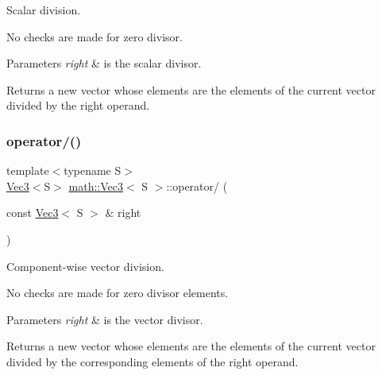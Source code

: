 Scalar division.

No checks are made for zero divisor.


\begin{DoxyParams}{Parameters}
{\em right} & is the scalar divisor.\\
\hline
\end{DoxyParams}
\begin{DoxyReturn}{Returns}
a new vector whose elements are the elements of the current vector divided by the right operand. 
\end{DoxyReturn}
\mbox{\label{classmath_1_1_vec3_a146b07bcbe24f5a380276adb8270b10e}} 
\subsubsection{\texorpdfstring{operator/()}{operator/()}\hspace{0.1cm}{\footnotesize\ttfamily [2/2]}}
{\footnotesize\ttfamily template$<$typename S$>$ \\
\hyperlink{classmath_1_1_vec3}{Vec3}$<$S$>$ \hyperlink{classmath_1_1_vec3}{math\+::\+Vec3}$<$ S $>$\+::operator/ (\begin{DoxyParamCaption}\item[{const \hyperlink{classmath_1_1_vec3}{Vec3}$<$ S $>$ \&}]{right }\end{DoxyParamCaption})\hspace{0.3cm}{\ttfamily [inline]}}

Component-\/wise vector division.

No checks are made for zero divisor elements.


\begin{DoxyParams}{Parameters}
{\em right} & is the vector divisor.\\
\hline
\end{DoxyParams}
\begin{DoxyReturn}{Returns}
a new vector whose elements are the elements of the current vector divided by the corresponding elements of the right operand. 
\end{DoxyReturn}
\mbox{\label{classmath_1_1_vec3_a870bc06ba74c497da633b3801ebaea0d}} 
